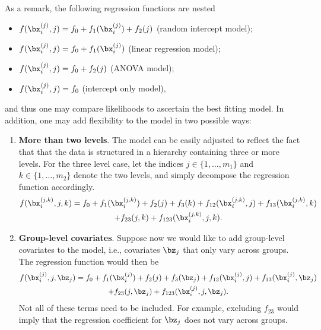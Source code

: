 As a remark, the following regression functions are nested 
\begin{itemize}
  \item $f(\bx_i^{(j)}, j) = f_0 + f_1(\bx_i^{(j)}) + f_2(j)$ (random intercept model);  %
  \item $f(\bx_i^{(j)}, j) = f_0 + f_1(\bx_i^{(j)})$ (linear regression model);
  \item $f(\bx_i^{(j)}, j) = f_0 + f_2(j)$ (ANOVA model);
  \item $f(\bx_i^{(j)}, j) = f_0 $ (intercept only model),
\end{itemize}
and thus one may compare likelihoods to ascertain the best fitting model.
In addition, one may add flexibility to the model in two possible ways:
\begin{enumerate}
  \item \textbf{More than two levels}. The model can be easily adjusted to reflect the fact that that the data is structured in a hierarchy containing three or more levels. For the three level case, let the indices $j\in\{1,\dots,m_1\}$ and $k\in\{1,\dots,m_2\}$ denote the two levels, and simply decompose the regression function accordingly.
  \begin{align*}
    \begin{gathered}
      f(\bx_i^{(j,k)}, j, k) = f_0 + f_1(\bx_i^{(j,k)}) + f_2(j) + f_3(k) + f_{12}(\bx_i^{(j,k)}, j) + f_{13}(\bx_i^{(j,k)}, k)\\ 
      + f_{23}(j, k) + f_{123}(\bx_i^{(j,k)}, j, k).
    \end{gathered}
  \end{align*}
  \item \textbf{Group-level covariates}. Suppose now we would like to add group-level covariates to the model, i.e., covariates $\bz_j$ that only vary across groups. The regression function would then be
  \begin{align*}
    \begin{gathered}
      f(\bx_i^{(j)}, j, \bz_j) = f_0 + f_1(\bx_i^{(j)}) + f_2(j) + f_3(\bz_j) + f_{12}(\bx_i^{(j)}, j) + f_{13}(\bx_i^{(j)}, \bz_j)\\ 
      + f_{23}(j, \bz_j) + f_{123}(\bx_i^{(j)}, j, \bz_j).
    \end{gathered}
  \end{align*}
  Not all of these terms need to be included.
  For example, excluding $f_{23}$ would imply that the regression coefficient for $\bz_j$ does not vary across groups.
\end{enumerate}

